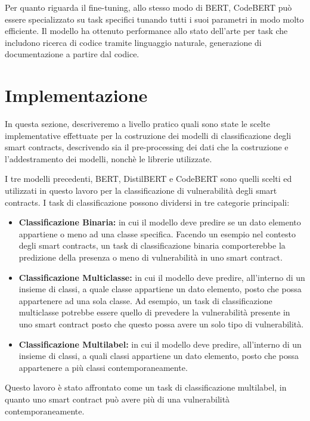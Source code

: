 \documentclass[../../Thesis.tex]{subfiles}
\begin{document}
Per quanto riguarda il fine-tuning, allo stesso modo di BERT, CodeBERT pu\`o essere specializzato su task specifici tunando tutti i suoi parametri in modo molto efficiente. Il modello ha ottenuto performance allo stato dell'arte per task che includono ricerca di codice tramite linguaggio naturale, generazione di documentazione a partire dal codice. 


\section{Implementazione}
In questa sezione, descriveremo a livello pratico quali sono state le scelte implementative effettuate per la costruzione dei modelli di classificazione degli smart contracts, descrivendo sia il pre-processing dei dati che la costruzione e l'addestramento dei modelli, nonch\`e le librerie utilizzate. 

I tre modelli precedenti, BERT, DistilBERT e CodeBERT sono quelli scelti ed utilizzati in questo lavoro per la classificazione di vulnerabilit\`a degli smart contracts. I task di classificazione possono dividersi in tre categorie principali: 
\begin{itemize}
    \item \textbf{Classificazione Binaria:} in cui il modello deve predire se un dato elemento appartiene o meno ad una classe specifica. Facendo un esempio nel contesto degli smart contracts, un task di classificazione binaria comporterebbe la predizione della presenza o meno di vulnerabilit\`a in uno smart contract. 
    \item \textbf{Classificazione Multiclasse:} in cui il modello deve predire, all'interno di un insieme di classi, a quale classe appartiene un dato elemento, posto che possa appartenere ad una sola classe. Ad esempio, un task di classificazione multiclasse potrebbe essere quello di prevedere la vulnerabilit\`a presente in uno smart contract posto che questo possa avere un solo tipo di vulnerabilit\`a.
    \item \textbf{Classificazione Multilabel:} in cui il modello deve predire, all'interno di un insieme di classi, a quali classi appartiene un dato elemento, posto che possa appartenere a pi\`u classi contemporaneamente. 
\end{itemize}
Questo lavoro \`e stato affrontato come un task di classificazione multilabel, in quanto uno smart contract pu\`o avere pi\`u di una vulnerabilit\`a contemporaneamente. 
\end{document}
